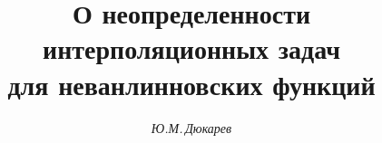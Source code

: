 




%





\newcommand{\im}{\operatorname{Im}}


\newcommand{\col}{\operatorname{col}}


\newcommand{\rank}{\operatorname{rank}}


\newcommand{\diag}{\operatorname{diag}}


\newcommand{\la}{\langle}


\newcommand{\ra}{\rangle}


\newcommand{\tts}[1]{}


\renewcommand{\baselinestretch}{0.98}







\setcounter{page}{26}















\author{\it Ю.М.\,Дюкарев}




\title{О неопределенности интерполяционных задач \\


для неванлинновских функций}





\date{}




\pagestyle{plain} %





